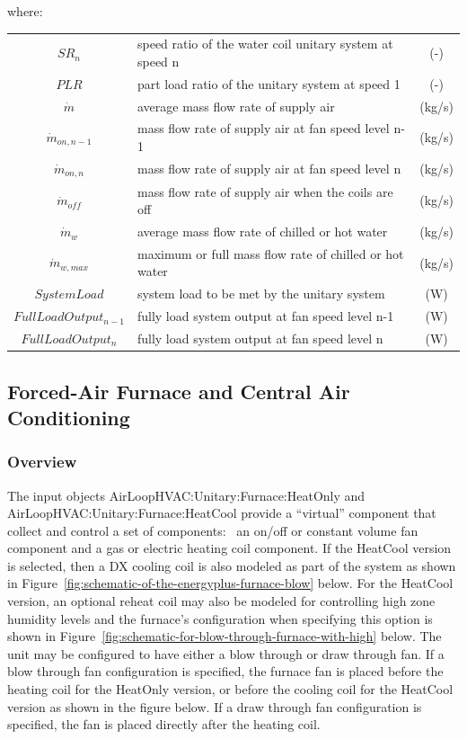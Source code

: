 where:

\begin{tabular}{clc}
  $SR_n$ & speed ratio of the water coil unitary system at speed n & (-) \\
  $PLR$ & part load ratio of the unitary system at speed 1 & (-) \\
  $\dot{m}$ & average mass flow rate of supply air & (kg/s) \\
  $\dot{m}_{on, n-1}$ & mass flow rate of supply air at fan speed level n-1 & (kg/s) \\
  $\dot{m}_{on, n}$ & mass flow rate of supply air at fan speed level n & (kg/s) \\
  $\dot{m}_{off}$ & mass flow rate of supply air when the coils are off & (kg/s) \\
  $\dot{m}_{w}$ & average mass flow rate of chilled or hot water & (kg/s) \\
  $\dot{m}_{w, max}$ & maximum or full mass flow rate of chilled or hot water & (kg/s) \\
  $SystemLoad$ & system load to be met by the unitary system & (W) \\
  $FullLoadOutput_{n-1}$ & fully load system output at fan speed level n-1 & (W) \\
  $FullLoadOutput_{n}$ & fully load system output at fan speed level n & (W)
\end{tabular}

\subsection{Forced-Air Furnace and Central Air Conditioning}\label{forced-air-furnace-and-central-air-conditioning}

\subsubsection{Overview}\label{overview-1}

The input objects AirLoopHVAC:Unitary:Furnace:HeatOnly and \\
AirLoopHVAC:Unitary:Furnace:HeatCool provide a ``virtual'' component that collect and control a set of components:~ an on/off or constant volume fan component and a gas or electric heating coil component. If the HeatCool version is selected, then a DX cooling coil is also modeled as part of the system as shown in Figure~\ref{fig:schematic-of-the-energyplus-furnace-blow} below. For the HeatCool version, an optional reheat coil may also be modeled for controlling high zone humidity levels and the furnace's configuration when specifying this option is shown in Figure~\ref{fig:schematic-for-blow-through-furnace-with-high} below. The unit may be configured to have either a blow through or draw through fan. If a blow through fan configuration is specified, the furnace fan is placed before the heating coil for the HeatOnly version, or before the cooling coil for the HeatCool version as shown in the figure below. If a draw through fan configuration is specified, the fan is placed directly after the heating coil.

